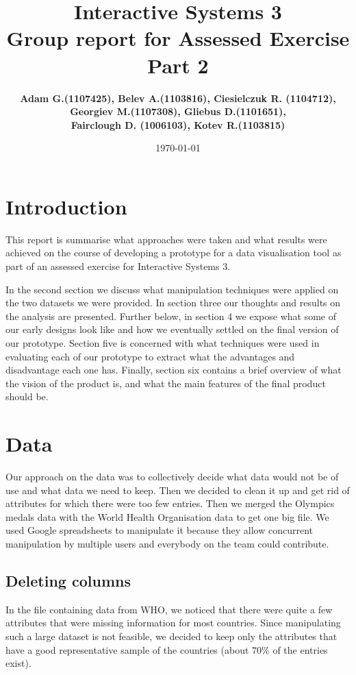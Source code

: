 \documentclass[a4paper]{article}
\title{Interactive Systems 3\\ \vspace{4mm} 
Group report for Assessed Exercise Part 2}
\author{\bf Adam G.(1107425), Belev A.(1103816), Ciesielczuk R. (1104712),\\ \bf Georgiev M.(1107308), Gliebus D.(1101651),\\ \bf Fairclough D. (1006103), Kotev R.(1103815)}
\date{\today}
\begin{document}
\maketitle

\section{Introduction}

This report is summarise what approaches were taken and what results were achieved on the course of developing a prototype for a data visualisation tool as part of an assessed exercise for Interactive Systems 3.

In the second section we discuss what manipulation techniques were applied on the two datasets we were provided. In section three our thoughts and results on the analysis are presented. Further below, in section 4 we expose what some of our early designs look like and how we eventually settled on the final version of our prototype. Section five is concerned with what techniques were used in evaluating each of our prototype to extract what the advantages and disadvantage each one has. Finally, section six contains a brief overview of what the vision of the product is, and what the main features of the final product should be.


\section{Data}

Our approach on the data was to collectively decide what data would not be of use and what data we need to keep. Then we decided to clean it up and get rid of attributes for which there were too few entries. Then we merged the Olympics medals data with the World Health Organisation data to get one big file.
We used Google spreadsheets to manipulate it because they allow concurrent manipulation by multiple users and everybody on the team could contribute.

\subsection{Deleting columns}

In the file containing data from WHO, we noticed that there were quite a few attributes that were missing information for most countries. Since manipulating such a large dataset is not feasible, we decided to keep only the attributes that have a good representative sample of the countries (about $70\%$ of the entries exist).
\end{document}

